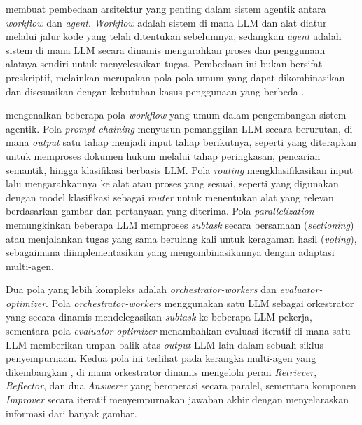 \textcite{anthropicBuildingEffectiveAgents2024} membuat pembedaan arsitektur yang penting dalam sistem agentik antara \textit{workflow} dan \textit{agent}. \textit{Workflow} adalah sistem di mana LLM dan alat diatur melalui jalur kode yang telah ditentukan sebelumnya, sedangkan \textit{agent} adalah sistem di mana LLM secara dinamis mengarahkan proses dan penggunaan alatnya sendiri untuk menyelesaikan tugas. Pembedaan ini bukan bersifat preskriptif, melainkan merupakan pola-pola umum yang dapat dikombinasikan dan disesuaikan dengan kebutuhan kasus penggunaan yang berbeda \parencite{anthropicBuildingEffectiveAgents2024}.

\textcite{anthropicBuildingEffectiveAgents2024} mengenalkan beberapa pola \textit{workflow} yang umum dalam pengembangan sistem agentik. Pola \textit{prompt chaining} menyusun pemanggilan LLM secara berurutan, di mana \textit{output} satu tahap menjadi input tahap berikutnya, seperti yang diterapkan \textcite{trautmannLargeLanguageModel2023} untuk memproses dokumen hukum melalui tahap peringkasan, pencarian semantik, hingga klasifikasi berbasis LLM. Pola \textit{routing} mengklasifikasikan input lalu mengarahkannya ke alat atau proses yang sesuai, seperti yang digunakan \textcite{xuMultimodalAgriculturalAgent2025} dengan model klasifikasi sebagai \textit{router} untuk menentukan alat yang relevan berdasarkan gambar dan pertanyaan yang diterima. Pola \textit{parallelization} memungkinkan beberapa LLM memproses \textit{subtask} secara bersamaan (\textit{sectioning}) atau menjalankan tugas yang sama berulang kali untuk keragaman hasil (\textit{voting}), sebagaimana diimplementasikan \textcite{xiaParallelismMeetsAdaptiveness2025} yang mengombinasikannya dengan adaptasi multi-agen.

Dua pola yang lebih kompleks adalah \textit{orchestrator-workers} dan \textit{evaluator-optimizer}. Pola \textit{orchestrator-workers} menggunakan satu LLM sebagai orkestrator yang secara dinamis mendelegasikan \textit{subtask} ke beberapa LLM pekerja, sementara pola \textit{evaluator-optimizer} menambahkan evaluasi iteratif di mana satu LLM memberikan umpan balik atas \textit{output} LLM lain dalam sebuah siklus penyempurnaan. Kedua pola ini terlihat pada kerangka multi-agen yang dikembangkan \textcite{keDynamicOrchestrationMultiAgent2025}, di mana orkestrator dinamis mengelola peran \textit{Retriever}, \textit{Reflector}, dan dua \textit{Answerer} yang beroperasi secara paralel, sementara komponen \textit{Improver} secara iteratif menyempurnakan jawaban akhir dengan menyelaraskan informasi dari banyak gambar.

